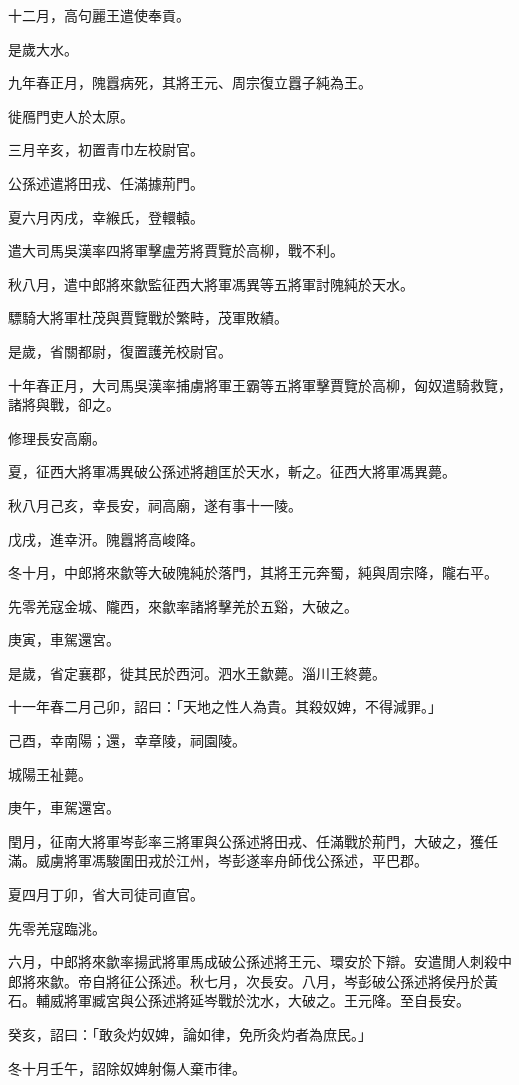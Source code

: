 \begin{pinyinscope}
十二月，高句麗王遣使奉貢。

是歲大水。

九年春正月，隗囂病死，其將王元、周宗復立囂子純為王。

徙鴈門吏人於太原。

三月辛亥，初置青巾左校尉官。

公孫述遣將田戎、任滿據荊門。

夏六月丙戌，幸緱氏，登轘轅。

遣大司馬吳漢率四將軍擊盧芳將賈覽於高柳，戰不利。

秋八月，遣中郎將來歙監征西大將軍馮異等五將軍討隗純於天水。

驃騎大將軍杜茂與賈覽戰於繁畤，茂軍敗績。

是歲，省關都尉，復置護羌校尉官。

十年春正月，大司馬吳漢率捕虜將軍王霸等五將軍擊賈覽於高柳，匈奴遣騎救覽，諸將與戰，卻之。

修理長安高廟。

夏，征西大將軍馮異破公孫述將趙匡於天水，斬之。征西大將軍馮異薨。

秋八月己亥，幸長安，祠高廟，遂有事十一陵。

戊戌，進幸汧。隗囂將高峻降。

冬十月，中郎將來歙等大破隗純於落門，其將王元奔蜀，純與周宗降，隴右平。

先零羌寇金城、隴西，來歙率諸將擊羌於五谿，大破之。

庚寅，車駕還宮。

是歲，省定襄郡，徙其民於西河。泗水王歙薨。淄川王終薨。

十一年春二月己卯，詔曰：「天地之性人為貴。其殺奴婢，不得減罪。」

己酉，幸南陽；還，幸章陵，祠園陵。

城陽王祉薨。

庚午，車駕還宮。

閏月，征南大將軍岑彭率三將軍與公孫述將田戎、任滿戰於荊門，大破之，獲任滿。威虜將軍馮駿圍田戎於江州，岑彭遂率舟師伐公孫述，平巴郡。

夏四月丁卯，省大司徒司直官。

先零羌寇臨洮。

六月，中郎將來歙率揚武將軍馬成破公孫述將王元、環安於下辯。安遣閒人刺殺中郎將來歙。帝自將征公孫述。秋七月，次長安。八月，岑彭破公孫述將侯丹於黃石。輔威將軍臧宮與公孫述將延岑戰於沈水，大破之。王元降。至自長安。

癸亥，詔曰：「敢灸灼奴婢，論如律，免所灸灼者為庶民。」

冬十月壬午，詔除奴婢射傷人棄市律。


\end{pinyinscope}

